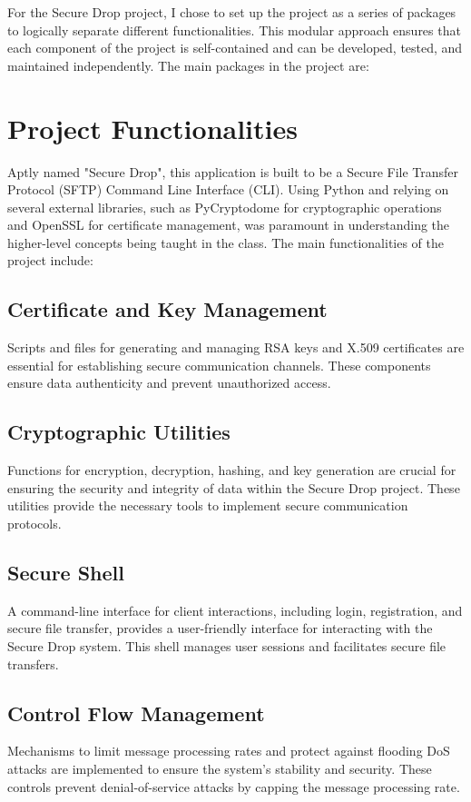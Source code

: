 \documentclass[12pt]{article}
\begin{document}
For the Secure Drop project, I chose to set up the project as a series of packages to logically separate different functionalities. This modular approach ensures that each component of the project is self-contained and can be developed, tested, and maintained independently. The main packages in the project are:


\newpage

\section{Project Functionalities}
Aptly named "Secure Drop", this application is built to be a Secure File Transfer Protocol (SFTP) Command Line Interface (CLI).
Using Python and relying on several external libraries, such as PyCryptodome for cryptographic operations and OpenSSL for certificate management, was paramount in understanding the higher-level concepts being taught in the class.
The main functionalities of the project include:

\subsection{Certificate and Key Management}
Scripts and files for generating and managing RSA keys and X.509 certificates are essential for establishing secure communication channels. These components ensure data authenticity and prevent unauthorized access.

\subsection{Cryptographic Utilities}
Functions for encryption, decryption, hashing, and key generation are crucial for ensuring the security and integrity of data within the Secure Drop project. These utilities provide the necessary tools to implement secure communication protocols.

\subsection{Secure Shell}
A command-line interface for client interactions, including login, registration, and secure file transfer, provides a user-friendly interface for interacting with the Secure Drop system. This shell manages user sessions and facilitates secure file transfers.

\subsection{Control Flow Management}
Mechanisms to limit message processing rates and protect against flooding DoS attacks are implemented to ensure the system's stability and security. These controls prevent denial-of-service attacks by capping the message processing rate.
\end{document}
